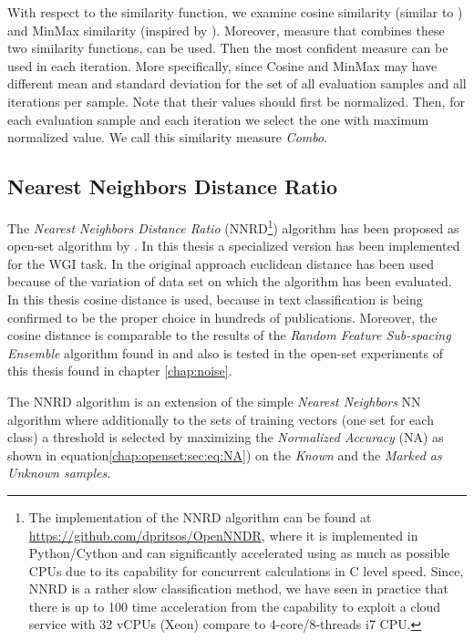With respect to the similarity function, we examine cosine similarity (similar to \parencite{pritsos2013open}) and MinMax similarity (inspired by \parencite{koppel2014determining}). Moreover, measure that combines these two similarity functions, can be used. Then the most confident measure can be used in each iteration. More specifically, since Cosine and MinMax may have different mean and standard deviation for the set of all evaluation samples and all iterations per sample. Note that their values should first be normalized. Then, for each evaluation sample and each iteration we select the one with maximum normalized value. We call this similarity measure \textit{Combo}.

\subsection{Nearest Neighbors Distance Ratio}\label{chap:openset:sec:NNRD_Description}

The \textit{Nearest Neighbors Distance Ratio} (NNRD\footnote{The implementation of the NNRD algorithm can be found at \url{https://github.com/dpritsos/OpenNNDR}, where it is implemented in Python/Cython and can significantly accelerated using as much as possible CPUs due to its capability for concurrent calculations in C level speed. Since, NNRD is a rather slow classification method, we have seen in practice that there is up to 100 time acceleration from the capability to exploit a cloud service with 32 vCPUs (Xeon) compare to 4-core/8-threads i7 CPU.}) algorithm has been proposed as open-set algorithm by \parencite{mendesjunior2016}. In this thesis a specialized version has been implemented for the WGI task. In the original approach euclidean distance has been used because of the variation of data set on which the algorithm has been evaluated. In this thesis cosine distance is used, because in text classification is being confirmed to be the proper choice in hundreds of publications. Moreover, the cosine distance is comparable to the results of the \textit{Random Feature Sub-spacing Ensemble} algorithm found in \parencite{pritsos2018open} and also is tested in the open-set experiments of this thesis found in chapter \ref{chap:noise}.

The NNRD algorithm is an extension of the simple \textit{Nearest Neighbors} NN algorithm where additionally to the sets of training vectors (one set for each class) a threshold is selected by maximizing the \textit{Normalized Accuracy} (NA) as shown in equation\ref{chap:openset:sec:eq:NA}) on the \textit{Known} and the \textit{Marked as Unknown samples}.

